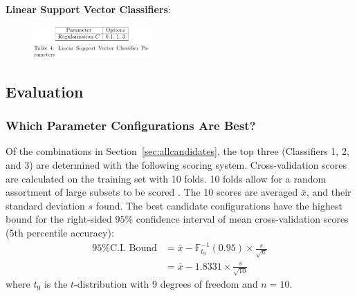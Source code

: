 \documentclass[11pt]{article}
\begin{document}
\pagebreak
\textbf{Linear Support Vector Classifiers}:

\begin{figure}[H]
	\centering
	\includegraphics[width = 0.4\textwidth]{tb svc.png}
	\label{tbl:svc-options}
\end{figure} 


\subsection{Evaluation}\label{sec:evaluations}

\subsubsection{Which Parameter Configurations Are Best?}\label{sec:choosing2}

Of the combinations in Section~\ref{sec:allcandidates}, 
the top three (Classifiers 1, 2, and 3) are determined with the following scoring system.
Cross-validation scores are calculated on the training set with 10 folds.
10 folds allow for a random assortment of large subsets to be scored .
The 10 scores are averaged $\bar{x}$, and their standard deviation $s$ found. 
The best candidate configurations have the highest bound for the right-sided $95\%$ confidence interval of mean cross-validation scores (5th percentile accuracy):
\begin{align*}
	\text{95\% C.I. Bound} &= \bar{x} - \mathbb{F}_{t_9}^{-1}(0.95) \times \frac{s}{\sqrt{n}} \\
	&= \bar{x} - 1.8331 \times \frac{s}{\sqrt{10}}
\end{align*}
where $t_9$ is the $t$-distribution with $9$ degrees of freedom and $n = 10$.
\end{document}
